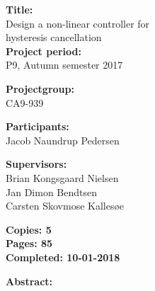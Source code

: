 \begin{minipage}[t]{0.48\textwidth}
\textbf{Title:} \\[5pt]\hspace*{2ex}
Design a non-linear controller for  \\\hspace*{2ex}
hysteresis cancellation \\

\textbf{Project period:} \\[5pt]\bigskip\hspace{2ex}
P9, Autumn semester 2017

\textbf{Projectgroup:} \\[5pt]\bigskip\hspace{2ex}
CA9-939

\textbf{Participants:} \\[5pt]\hspace*{2ex}
Jacob Naundrup Pedersen \\\hspace*{2ex}


\textbf{Supervisors:} \\[5pt]\hspace*{2ex}
Brian Kongsgaard Nielsen \\ \hspace*{2ex} %
Jan Dimon Bendtsen \\\hspace*{2ex}
Carsten Skovmose Kallesøe \\\hspace*{2ex}

\vspace*{3.0cm}

\textbf{Copies: 5} \\
\textbf{Pages: 85}\\
\textbf{Completed: 10-01-2018}\\

\end{minipage}
\hfill
\begin{minipage}[t]{0.483\textwidth}
\textbf{Abstract:} \\[5pt]
\fbox{\parbox{7cm}{\bigskip\bigskip}}
\end{minipage}

\vfill

{\footnotesize\itshape}





